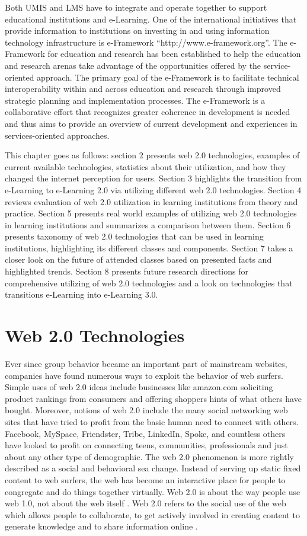 \documentclass[12pt,a4paper,final,twoside,onecolumn,titlepage]{book}
\begin{document}
Both \gls{UMIS} and \gls{LMS} have to integrate and operate together to support educational institutions and e-Learning. One of the international initiatives that provide information to institutions on investing in and using information technology infrastructure is e-Framework “http://www.e-framework.org”. The e-Framework for education and research has been established to help the education and research arenas take advantage of the opportunities offered by the service-oriented approach. The primary goal of the e-Framework is to facilitate technical interoperability within and across education and research through improved strategic planning and implementation processes. The e-Framework is a collaborative effort that recognizes greater coherence in development is needed and thus aims to provide an overview of current development and experiences in services-oriented approaches.

This chapter goes as follows: section 2 presents web 2.0 technologies, examples of current available technologies, statistics about their utilization, and how they changed the internet perception for users. Section 3 highlights the transition from e-Learning to e-Learning 2.0 via utilizing different web 2.0 technologies. Section 4 reviews evaluation of web 2.0 utilization in learning institutions from theory and practice. Section 5 presents real world examples of utilizing web 2.0 technologies in learning institutions and summarizes a comparison between them. Section 6 presents taxonomy of web 2.0 technologies that can be used in learning institutions, highlighting its different classes and components. Section 7 takes a closer look on the future of attended classes based on presented facts and highlighted trends. Section 8 presents future research directions for comprehensive utilizing of web 2.0 technologies and a look on technologies that transitions e-Learning into e-Learning 3.0.

\section{Web 2.0 Technologies}
Ever since group behavior became an important part of mainstream websites, companies have found numerous ways to exploit the behavior of web surfers. Simple uses of web 2.0 ideas include businesses like amazon.com soliciting product rankings from consumers and offering shoppers hints of what others have bought. Moreover, notions of web 2.0 include the many social networking web sites that have tried to profit from the basic human need to connect with others. Facebook, MySpace, Friendster, Tribe, LinkedIn, Spoke, and countless others have looked to profit on connecting teens, communities, professionals and just about any other type of demographic. The web 2.0 phenomenon is more rightly described as a social and behavioral sea change. Instead of serving up static fixed content to web surfers, the web has become an interactive place for people to congregate and do things together virtually. Web 2.0 is about the way people use web 1.0, not about the web itself \cite{W02}. Web 2.0 refers to the social use of the web which allows people to collaborate, to get actively involved in creating content to generate knowledge and to share information online \cite{W03}.
\end{document}
